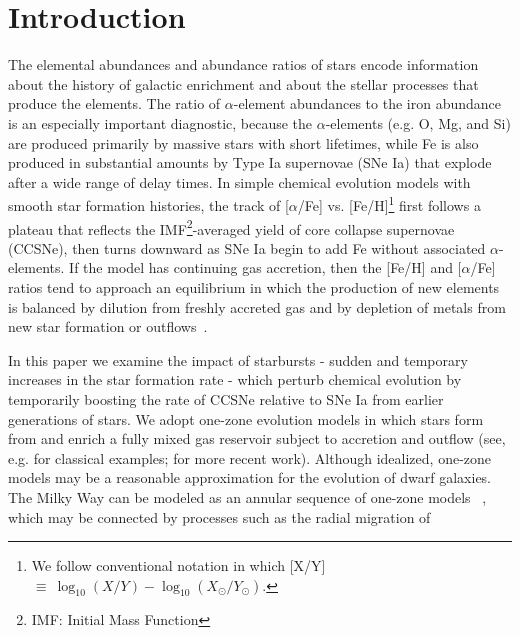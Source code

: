 
\section{Introduction}
\label{bursts:sec:intro}
The elemental abundances and abundance ratios of stars encode information 
about the history of galactic enrichment and about the stellar processes that 
produce the elements. The ratio of $\alpha$-element abundances to the iron 
abundance is an especially important diagnostic, because the $\alpha$-elements 
(e.g. O, Mg, and Si) are produced primarily by massive stars with short 
lifetimes, while Fe is also produced in substantial amounts by Type Ia 
supernovae (SNe Ia) that explode after a wide range of delay times. In simple 
chemical evolution models with smooth star formation histories, the track of 
[$\alpha$/Fe] vs. [Fe/H]\footnote{
	We follow conventional notation in which [X/Y] $\equiv\ \log_{10}(X/Y) 
	- \log_{10}(X_\odot/Y_\odot)$.  
} first follows a plateau that reflects the IMF\footnote{
	IMF: Initial Mass Function 
}-averaged yield of core collapse supernovae (CCSNe), then turns downward as 
SNe Ia begin to add Fe without associated $\alpha$-elements. If the model has 
continuing gas accretion, then the [Fe/H] and [$\alpha$/Fe] ratios tend to 
approach an equilibrium in which the production of new elements is balanced by 
dilution from freshly accreted gas and by depletion of metals from new star 
formation or outflows~\citep{Larson1972, Finlator2008, Andrews2017,
Weinberg2017b}.
\par\null\par\null\par 
In this paper we examine the impact of starbursts - sudden and temporary 
increases in the star formation rate - which perturb chemical evolution by 
temporarily boosting the rate of CCSNe relative to SNe Ia from earlier 
generations of stars. We adopt one-zone evolution models in which stars form 
from and enrich a fully mixed gas reservoir subject to accretion and outflow
(see, e.g. \citealp{Schmidt1959, Schmidt1963, Larson1972, Tinsley1980} for 
classical examples; \citealp{Weinberg2017b, Andrews2017} for 
more recent work). Although idealized, one-zone models may be a reasonable 
approximation for the evolution of dwarf galaxies. The Milky Way can be 
modeled as an annular sequence of one-zone models ~\citep{Matteucci1989}, 
which may be connected by processes such as the radial migration of 
